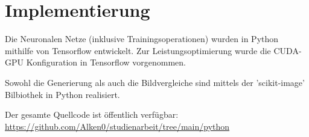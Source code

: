 
\chapter{Implementierung}

Die Neuronalen Netze (inklusive Trainingsoperationen) wurden in Python mithilfe von Tensorflow \cite{tensorflow} entwickelt.
Zur Leistungsoptimierung wurde die CUDA-GPU Konfiguration in Tensorflow vorgenommen.
\newline

Sowohl die Generierung als auch die Bildvergleiche sind mittels der 'scikit-image' Bilbiothek in Python realisiert.
\newline

Der gesamte Quellcode ist öffentlich verfügbar:
\newline
\url{https://github.com/Alken0/studienarbeit/tree/main/python} 
